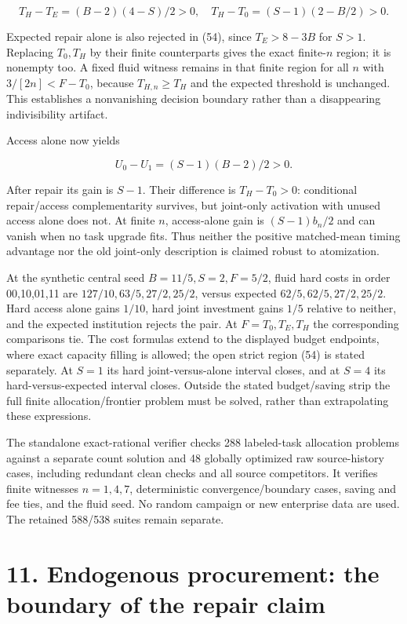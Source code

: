 \documentclass[
  11pt,
  a4paper,
]{article}
\begin{document}
\[T_H-T_E=(B-2)(4-S)/2>0,\quad
T_H-T_0=(S-1)(2-B/2)>0. \tag{55}\]

Expected repair alone is also rejected in (54), since \(T_E>8-3B\) for
\(S>1\). Replacing \(T_0,T_H\) by their finite counterparts gives the
exact finite-\(n\) region; it is nonempty too. A fixed fluid witness
remains in that finite region for all \(n\) with \(3/[2n]<F-T_0\),
because \(T_{H,n}\geq T_H\) and the expected threshold is unchanged.
This establishes a nonvanishing decision boundary rather than a
disappearing indivisibility artifact.

Access alone now yields

\[U_0-U_1=(S-1)(B-2)/2>0. \tag{56}\]

After repair its gain is \(S-1\). Their difference is \(T_H-T_0>0\):
conditional repair/access complementarity survives, but joint-only
activation with unused access alone does not. At finite \(n\),
access-alone gain is \((S-1)b_n/2\) and can vanish when no task upgrade
fits. Thus neither the positive matched-mean timing advantage nor the
old joint-only description is claimed robust to atomization.

At the synthetic central seed \(B=11/5,S=2,F=5/2\), fluid hard costs in
order 00,10,01,11 are \(127/10,63/5,27/2,25/2\), versus expected
\(62/5,62/5,27/2,25/2\). Hard access alone gains \(1/10\), hard joint
investment gains \(1/5\) relative to neither, and the expected
institution rejects the pair. At \(F=T_0,T_E,T_H\) the corresponding
comparisons tie. The cost formulas extend to the displayed budget
endpoints, where exact capacity filling is allowed; the open strict
region (54) is stated separately. At \(S=1\) its hard joint-versus-alone
interval closes, and at \(S=4\) its hard-versus-expected interval
closes. Outside the stated budget/saving strip the full finite
allocation/frontier problem must be solved, rather than extrapolating
these expressions.

The standalone exact-rational verifier checks 288 labeled-task
allocation problems against a separate count solution and 48 globally
optimized raw source-history cases, including redundant clean checks and
all source competitors. It verifies finite witnesses \(n=1,4,7\),
deterministic convergence/boundary cases, saving and fee ties, and the
fluid seed. No random campaign or new enterprise data are used. The
retained 588/538 suites remain separate.

\hypertarget{endogenous-procurement-the-boundary-of-the-repair-claim}{%
\section{11. Endogenous procurement: the boundary of the repair
claim}\label{endogenous-procurement-the-boundary-of-the-repair-claim}}
\end{document}
